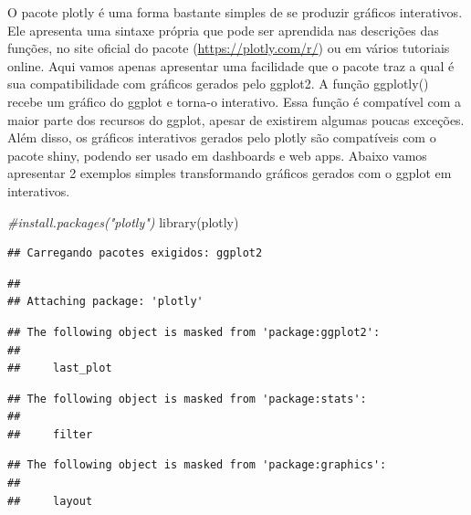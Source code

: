 \documentclass[
]{book}
\newenvironment{Shaded}{\begin{snugshade}}{\end{snugshade}}
\newcommand{\CommentTok}[1]{\textcolor[rgb]{0.56,0.35,0.01}{\textit{#1}}}
\newcommand{\FunctionTok}[1]{\textcolor[rgb]{0.00,0.00,0.00}{#1}}
\newcommand{\NormalTok}[1]{#1}
\begin{document}
O pacote plotly é uma forma bastante simples de se produzir gráficos interativos. Ele apresenta uma sintaxe própria que pode ser aprendida nas descrições das funções, no site oficial do pacote (\url{https://plotly.com/r/}) ou em vários tutoriais online. Aqui vamos apenas apresentar uma facilidade que o pacote traz a qual é sua compatibilidade com gráficos gerados pelo ggplot2. A função ggplotly() recebe um gráfico do ggplot e torna-o interativo. Essa função é compatível com a maior parte dos recursos do ggplot, apesar de existirem algumas poucas exceções. Além disso, os gráficos interativos gerados pelo plotly são compatíveis com o pacote shiny, podendo ser usado em dashboards e web apps. Abaixo vamos apresentar 2 exemplos simples transformando gráficos gerados com o ggplot em interativos.

\begin{Shaded}
\begin{Highlighting}[]
\CommentTok{\#install.packages("plotly")}
\FunctionTok{library}\NormalTok{(plotly)}
\end{Highlighting}
\end{Shaded}

\begin{verbatim}
## Carregando pacotes exigidos: ggplot2
\end{verbatim}

\begin{verbatim}
## 
## Attaching package: 'plotly'
\end{verbatim}

\begin{verbatim}
## The following object is masked from 'package:ggplot2':
## 
##     last_plot
\end{verbatim}

\begin{verbatim}
## The following object is masked from 'package:stats':
## 
##     filter
\end{verbatim}

\begin{verbatim}
## The following object is masked from 'package:graphics':
## 
##     layout
\end{verbatim}
\end{document}
